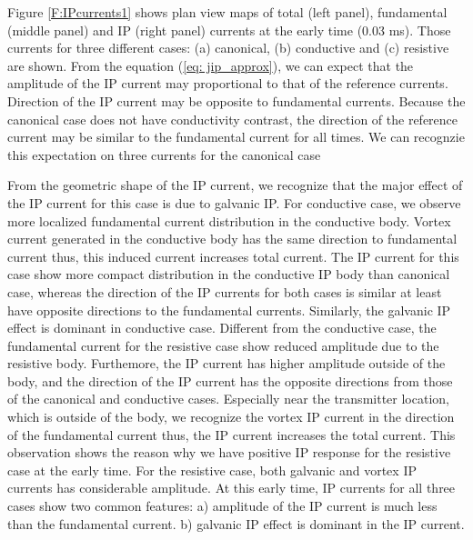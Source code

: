 \documentclass[a4paper, 11pt]{article}
\begin{document}
Figure \ref{F:IPcurrents1} shows plan view maps of total (left panel), fundamental (middle panel) and IP (right panel) currents at the early time (0.03 ms).  Those currents for three different cases: (a) canonical, (b) conductive and (c) resistive are shown. From the equation (\ref{eq: jip_approx}), we can expect that the amplitude of the IP current may proportional to that of the reference currents. Direction of the IP current may be opposite to fundamental currents. Because the canonical case does not have conductivity contrast, the direction of the reference current may be similar to the fundamental current for all times. We can recognzie this expectation on three currents for the canonical case

From the geometric shape of the IP current, we recognize that the major effect of the IP current for this case is due to galvanic IP. For conductive case, we observe more localized fundamental current distribution in the conductive body. Vortex current generated in the conductive body has the same direction to fundamental current thus, this induced current increases total current.  The IP current for this case show more compact distribution in the conductive IP body than canonical case, whereas the direction of the IP currents for both cases is similar at least have opposite directions to the fundamental currents. Similarly, the galvanic IP effect is dominant in conductive case. Different from the conductive case, the fundamental current for the resistive case show reduced amplitude due to the resistive body. Furthemore, the IP current has higher amplitude outside of the body, and the direction of the IP current has the opposite directions from those of the canonical and conductive cases. Especially near the transmitter location, which is outside of the body, we recognize the vortex IP current in the direction of the fundamental current thus, the IP current increases the total current. This observation shows the reason why we have positive IP response for the resistive case at the early time. For the resistive case, both galvanic and vortex IP currents has considerable amplitude. At this early time, IP currents for all three cases show two common features: a) amplitude of the IP current is much less than the fundamental current. b) galvanic IP effect is dominant in the IP current. 
\end{document}

